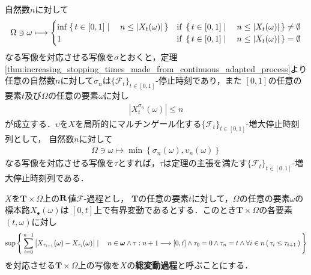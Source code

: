 	\begin{sketch}
		自然数$n$に対して
		\begin{align}
			\Omega \ni \omega \longmapsto
			\begin{cases}
				\operatorname*{inf}_{} \left\{\, t \in [0,1] \mid \quad n \leq |X_{t}(\omega)|\, \right\} 
				& \mbox{if } \left\{\, t \in [0,1] \mid \quad n \leq |X_{t}(\omega)|\, \right\} \neq \emptyset \\
				1 & \mbox{if } \left\{\, t \in [0,1] \mid \quad n \leq |X_{t}(\omega)|\, \right\} = \emptyset
			\end{cases}
		\end{align}
		なる写像を対応させる写像を$\sigma$とおくと，定理\ref{thm:increasing_stopping_times_made_from_continuous_adapted_process}より
		任意の自然数$n$に対して$\sigma_{n}$は$\{\mathscr{F}_{t}\}_{t \in [0,1]}$-停止時刻であり，また
		$[0,1]$の任意の要素$t$及び$\Omega$の任意の要素$\omega$に対し
		\begin{align}
			\left| X^{\sigma_{n}}_{t}(\omega) \right| \leq n
		\end{align}
		が成立する．$\upsilon$を$X$を局所的にマルチンゲール化する$\{\mathscr{F}_{t}\}_{t \in [0,1]}$-増大停止時刻列として，
		自然数$n$に対して
		\begin{align}
			\Omega \ni \omega \longmapsto \min\left\{ \sigma_{n}(\omega),\upsilon_{n}(\omega) \right\}
		\end{align}
		なる写像を対応させる写像を$\tau$とすれば，$\tau$は定理の主張を満たす$\{\mathscr{F}_{t}\}_{t \in [0,1]}$-増大停止時刻列である．
		\QED
	\end{sketch}
	
	\begin{screen}
		\begin{dfn}[総変動過程]
			$X$を$\mathbf{T} \times \Omega$上の$\mathbf{R}$値$\mathscr{F}$-過程とし，
			$\mathbf{T}$の任意の要素$t$に対して，$\Omega$の任意の要素$\omega$の標本路$X_{\bullet}(\omega)$は
			$[0,t]$上で有界変動であるとする．このとき$\mathbf{T} \times \Omega$の各要素$(t,\omega)$に対し
			\begin{align}
				\sup{}{
					\Set{\sum_{i=0}^{n-1}\left|X_{\tau_{i+1}}(\omega) - X_{\tau_{i}}(\omega)\right|}{
						n \in \Natural \wedge \tau:n+1 \longrightarrow [0,t] \wedge
						\tau_{0} = 0 \wedge \tau_{n} = t \wedge 
						\forall i \in n\, (\, \tau_{i} \leq \tau_{i+1}\, )
					}
				}
			\end{align}
			を対応させる$\mathbf{T} \times \Omega$上の写像を$X$の{\bf 総変動過程}と呼ぶことにする．
		\end{dfn}
	\end{screen}
	
